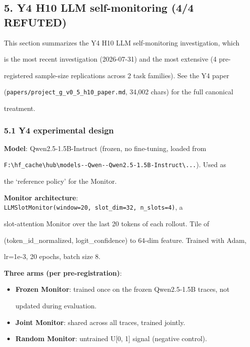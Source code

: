 \documentclass[11pt]{article}
\begin{document}
\subsection{5. Y4 H10 LLM self-monitoring (4/4
REFUTED)}\label{y4-h10-llm-self-monitoring-44-refuted}

This section summarizes the Y4 H10 LLM self-monitoring investigation,
which

is the most recent investigation (2026-07-31) and the most extensive (4
pre-

registered sample-size replications across 2 task families). See the Y4
paper

(\texttt{papers/project\_g\_v0\_5\_h10\_paper.md}, 34,002 chars) for the
full canonical

treatment.

\subsubsection{5.1 Y4 experimental design}\label{y4-experimental-design}

\textbf{Model}: Qwen2.5-1.5B-Instruct (frozen, no fine-tuning, loaded
from

\texttt{F:\textbackslash{}hf\_cache\textbackslash{}hub\textbackslash{}models-\/-Qwen-\/-Qwen2.5-1.5B-Instruct\textbackslash{}...}).
Used as

the `reference policy' for the Monitor.

\textbf{Monitor architecture}:
\texttt{LLMSlotMonitor(window=20,\ slot\_dim=32,\ n\_slots=4)}, a

slot-attention Monitor over the last 20 tokens of each rollout. Tile of

(token\_id\_normalized, logit\_confidence) to 64-dim feature. Trained
with Adam,

lr=1e-3, 20 epochs, batch size 8.

\textbf{Three arms (per pre-registration)}:

\begin{itemize}
\item
  \textbf{Frozen Monitor}: trained once on the frozen Qwen2.5-1.5B
  traces, not

  updated during evaluation.
\item
  \textbf{Joint Monitor}: shared across all traces, trained jointly.
\item
  \textbf{Random Monitor}: untrained U{[}0, 1{]} signal (negative
  control).
\end{itemize}
\end{document}
